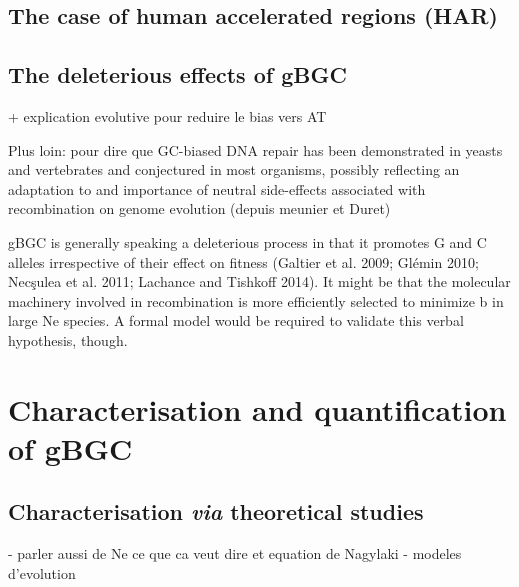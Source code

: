 \subsection{The case of human accelerated regions (HAR)}



\subsection{The deleterious effects of gBGC}
+ explication evolutive pour reduire le bias vers AT



Plus loin: \citep{marais2003biased} pour dire que  GC-biased DNA repair has been
demonstrated in yeasts and vertebrates and conjectured
in most organisms, possibly reflecting an adaptation to
and importance of neutral side-effects
associated with recombination on genome evolution
(depuis meunier et Duret)




gBGC is generally speaking a deleterious process in that it promotes G and C alleles irrespective of their effect on fitness (Galtier et al. 2009; Glémin 2010; Necşulea et al. 2011; Lachance and Tishkoff 2014). It might be that the molecular machinery involved in recombination is more efficiently selected to minimize b in large Ne species. A formal model would be required to validate this verbal hypothesis, though. 



\section{Characterisation and quantification of gBGC}
\subsection{Characterisation \textit{via} theoretical studies}
- parler aussi de Ne ce que ca veut dire et equation de Nagylaki
- modeles d'evolution
